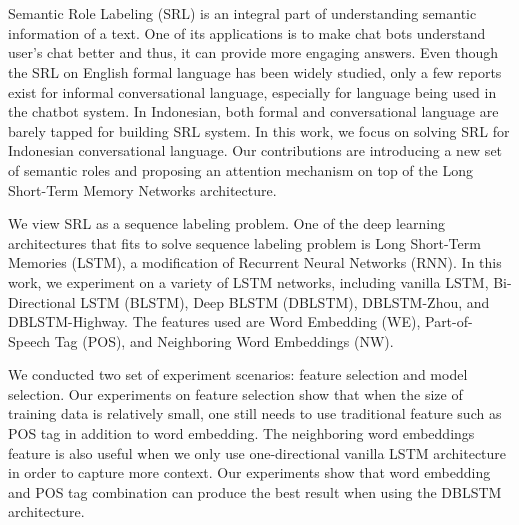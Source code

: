 \chapter{\babEnam}

Semantic Role Labeling (SRL) is an integral part of understanding semantic information of a text. One of its applications is to make chat bots understand user's chat better and thus, it can provide more engaging answers. Even though the SRL on English formal language has been widely studied, only a few reports exist for informal conversational language, especially for language being used in the chatbot system. In Indonesian, both formal and conversational language are barely tapped for building SRL system. In this work, we focus on solving SRL for Indonesian conversational language. Our contributions are introducing a new set of semantic roles and proposing an attention mechanism on top of the Long Short-Term Memory Networks architecture. 

We view SRL as a sequence labeling problem. One of the deep learning architectures that fits to solve sequence labeling problem is Long Short-Term Memories (LSTM), a modification of Recurrent Neural Networks (RNN). In this work, we experiment on a variety of LSTM networks, including vanilla LSTM, Bi-Directional LSTM (BLSTM), Deep BLSTM (DBLSTM), DBLSTM-Zhou, and DBLSTM-Highway. The features used are Word Embedding (WE), Part-of-Speech Tag (POS), and Neighboring Word Embeddings (NW).

We conducted two set of experiment scenarios: feature selection and model selection. Our experiments on feature selection show that when the size of training data is relatively small, one still needs to use traditional feature such as POS tag in addition to word embedding. The neighboring word embeddings feature is also useful when we only use one-directional vanilla LSTM architecture in order to capture more context. Our experiments show that word embedding and POS tag combination can produce the best result when using the DBLSTM architecture. 

